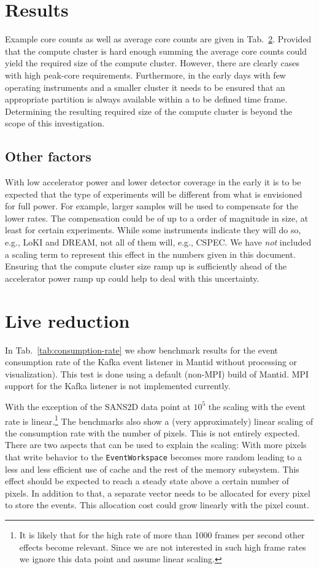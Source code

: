 \documentclass[a4paper,english,numbers=noenddot,bibliography=totoc,chapterprefix=on,DIV=12]{scrartcl}
\newcommand{\cspec}{CSPEC\xspace}
\newcommand{\dream}{DREAM\xspace}
\newcommand{\loki}{LoKI\xspace}
\begin{document}
\section{Results}

Example core counts as well as average core counts are given in Tab.~\ref{}.
Provided that the compute cluster is hard enough summing the average core counts could yield the required size of the compute cluster.
However, there are clearly cases with high peak-core requirements.
Furthermore, in the early days with few operating instruments and a smaller cluster it needs to be ensured that an appropriate partition is always available within a to be defined time frame.
Determining the resulting required size of the compute cluster is beyond the scope of this investigation.

\subsection{Other factors}

With low accelerator power and lower detector coverage in the early it is to be expected that the type of experiments will be different from what is envisioned for full power.
For example, larger samples will be used to compensate for the lower rates.
The compensation could be of up to a order of magnitude in size, at least for certain experiments.
While some instruments indicate they will do so, e.g., \loki and \dream, not all of them will, e.g., \cspec.
We have \emph{not} included a scaling term to represent this effect in the numbers given in this document.
Ensuring that the compute cluster size ramp up is sufficiently ahead of the accelerator power ramp up could help to deal with this uncertainty.

\section{Live reduction}

In Tab.~\ref{tab:consumption-rate} we show benchmark results for the event consumption rate of the Kafka event listener in Mantid without processing or visualization).
This test is done using a default (non-MPI) build of Mantid.
MPI support for the Kafka listener is not implemented currently.

With the exception of the SANS2D data point at $10^5$ the scaling with the event rate is linear.\footnote{It is likely that for the high rate of more than 1000 frames per second other effects become relevant. Since we are not interested in such high frame rates we ignore this data point and assume linear scaling.}
The benchmarks also show a (very approximately) linear scaling of the consumption rate with the number of pixels.
This is not entirely expected.
There are two aspects that can be used to explain the scaling:
With more pixels that write behavior to the \verb|EventWorkspace| becomes more random leading to a less and less efficient use of cache and the rest of the memory subsystem.
This effect should be expected to reach a steady state above a certain number of pixels.
In addition to that, a separate vector needs to be allocated for every pixel to store the events.
This allocation cost could grow linearly with the pixel count.
\end{document}
